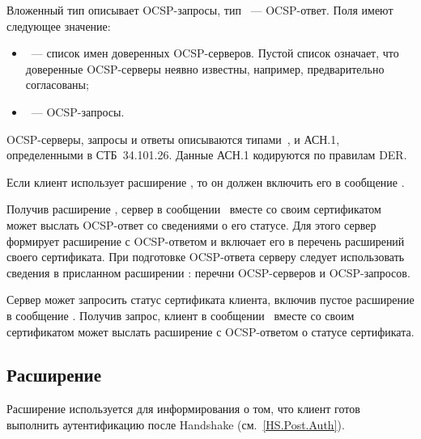 Вложенный тип  описывает OCSP-запросы,
тип ~--- OCSP-ответ.
%
Поля имеют следующее значение:
%
\begin{itemize}
\item
{}~--- список имен доверенных OCSP-серверов. Пустой 
список означает, что доверенные OCSP-серверы неявно известны, например, 
предварительно согласованы;
\item
{}~--- OCSP-запросы.
\end{itemize}

OCSP-серверы, запросы и ответы описываются типами~, 
 и  АСН.1, определенными в СТБ~34.101.26.
%
Данные АСН.1 кодируются по правилам DER.

Если клиент использует расширение , то он должен 
включить его в сообщение .

Получив расширение , сервер в 
сообщении~ вместе со своим сертификатом 
может выслать OCSP-ответ со сведениями о его статусе.
%
Для этого сервер формирует расширение  с OCSP-ответом 
и включает его в перечень расширений своего сертификата.
%
При подготовке OCSP-ответа серверу следует использовать сведения 
в присланном расширении : перечни OCSP-серверов и 
OCSP-запросов. 


Сервер может запросить статус сертификата клиента, включив пустое расширение 
 в сообщение .
%
Получив запрос, клиент в сообщении~ вместе со 
своим сертификатом может выслать расширение  с 
OCSP-ответом о статусе сертификата.

\subsection{Расширение }\label{HS.Ext.pha} 

Расширение  используется для информирования о том,
что клиент готов выполнить аутентификацию после Handshake 
(см.~\ref{HS.Post.Auth}). 

